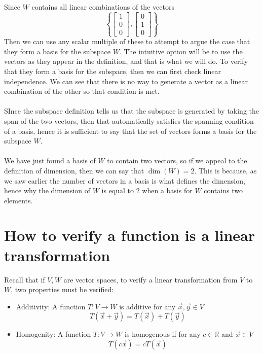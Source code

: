 \documentclass{report}
\begin{document}
\sol Since $W$ contains all linear combinations of the vectors
$$
\left\{\begin{bmatrix} 1\\0\\0 \end{bmatrix},\begin{bmatrix} 0\\1\\0 \end{bmatrix}\right\}
$$
Then we can use any scalar multiple of these to attempt to argue the case that they form a basis for the subspace $W$.  The intuitive option will be to use the vectors as they appear in the definition,  and that is what we will do.  To verify that they form a basis for the subspace,  then we can first check linear independence.  We can see that there is no way to generate a vector as a linear combination of the other so that condition is met. \\
\\
\noindent SInce the subspace definition tells us that the subspace is generated by taking the span of the two vectors,  then that automatically satisfies the spanning condition of a basis,  hence it is sufficient to say that the set of vectors forms a basis for the subspace $W$.\\
\\
\noindent We have just found a basis of $W$ to contain two vectors,  so if we appeal to the definition of dimension, then we can say that $\dim(W)=2$.  This is because,  as we saw earlier the number of vectors in a basis is what defines the dimension,  hence why the dimension of $W$ is equal to 2 when a basis for $W$ contains two elements.
\section{How to verify a function is a linear transformation}
Recall that if $V,W$ are vector spaces, to verify a linear transformation from $V$ to $W$, two properties must be verified:
\begin{itemize}
\item Additivity: A function $T:V\rightarrow W$ is additive for any $\vec{x},\vec{y}\in V$
$$
T(\vec{x}+\vec{y}) = T(\vec{x}) + T(\vec{y})
$$
\item Homogenity: A function $T:V \rightarrow W$ is homogenous if for any $c\in\mathbb{R}$ and $\vec{x}\in V$
$$
T(c\vec{x}) = cT(\vec{x})
$$
\end{itemize}
\pagebreak
{}
\end{document}
